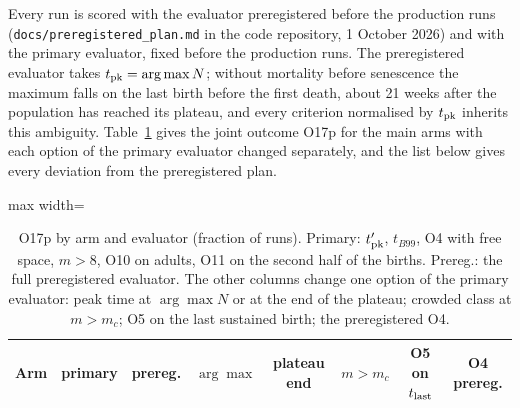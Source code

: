 \documentclass[preprint,12pt,authoryear]{elsarticle}
\begin{document}
Every run is scored with the evaluator preregistered before the production runs (\texttt{docs/preregistered\_plan.md}
in the code repository, 1 October 2026) and with the primary evaluator, fixed before the production runs. The
preregistered evaluator takes $t_{\rm pk}=\arg\max N$; without mortality before senescence the maximum falls on the
last birth before the first death, about 21 weeks after the population has reached its plateau, and every criterion
normalised by $t_{\rm pk}$ inherits this ambiguity. Table~\ref{tab:res-rescoring} gives the joint outcome O17p for the
main arms with each option of the primary evaluator changed separately, and the list below gives every deviation
from the preregistered plan.

\begin{table}[ht]
\centering
\caption{O17p by arm and evaluator (fraction of runs). Primary: $t'_{\rm pk}$, $t_{B99}$, O4 with free space,
$m>8$, O10 on adults, O11 on the second half of the births. Prereg.: the full preregistered evaluator. The other columns
change one option of the primary evaluator: peak time at $\arg\max N$ or at the end of the plateau; crowded class
at $m>m_c$; O5 on the last sustained birth; the preregistered O4.}
\label{tab:res-rescoring}
\footnotesize
\setlength{\tabcolsep}{4pt}
\begin{adjustbox}{max width=\textwidth}
\begin{tabular}{@{}lccccccc@{}}
\toprule
Arm & primary & prereg. & $\arg\max$ & plateau end & $m>m_c$ & O5 on $t_{\rm last}$ & O4 prereg. \\
\midrule

\end{tabular}
\end{adjustbox}
\end{table}
\end{document}
